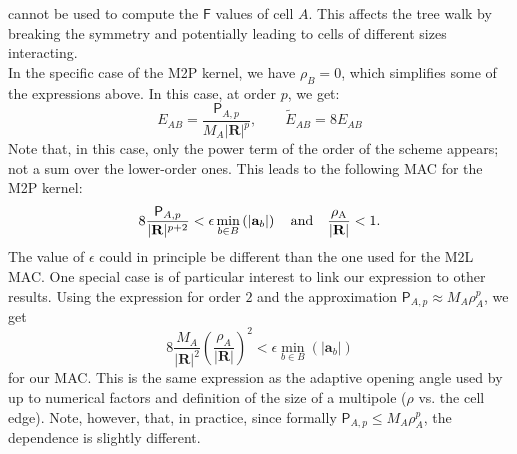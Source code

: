 cannot be used to compute the $\mathsf{F}$ values of cell $A$. This affects
the tree walk by breaking the symmetry and potentially leading to cells of
different sizes interacting. \\
In the specific case of the M2P kernel, we have $\rho_B = 0$, which
simplifies some of the expressions above. In this case, at order $p$, we get:
\begin{equation}
  E_{AB} = \frac{\mathsf{P}_{A,p}}{M_A |\mathbf{R}|^p}, \qquad
  \tilde{E}_{AB} = 8E_{AB} \nonumber
\end{equation}
Note that, in this case, only the power term of the order of the
scheme appears; not a sum over the lower-order ones. This leads to the
following MAC for the M2P kernel:
\begin{equation}
  8\frac{\mathsf{P}_{A,p}}{|\mathbf{R}|^{p+2}} < \epsilon \min_{b\in
    B}\left(|\mathbf{a}_b|\right) \quad \rm{and} \quad \frac{\rho_A}
  {|\mathbf{R}|} < 1.
    \label{eq:fmm:mac_m2p}  
\end{equation}
The value of $\epsilon$ could in principle be different than the one
used for the M2L MAC. One special case is of particular interest to
link our expression to other results. Using the expression for order
$2$ and the approximation $\mathsf{P}_{A,p} \approx M_A \rho_A^p$, we
get
\begin{equation}
  8\frac{M_A}{|\mathbf{R}|^2}\left(\frac{\rho_A}{|\mathbf{R}|}\right)^2
  < \epsilon \min_{b\in B}\left(|\mathbf{a}_b|\right) \nonumber
\end{equation}
for our MAC.  This is the same expression as the adaptive opening
angle used by \gadget \cite[see eq.18 of][]{Springel2005} up to
numerical factors and definition of the size of a multipole ($\rho$
vs. the cell edge). Note, however, that, in practice, since formally
$\mathsf{P}_{A,p} \leq M_A \rho_A^p$, the dependence is slightly
different.

